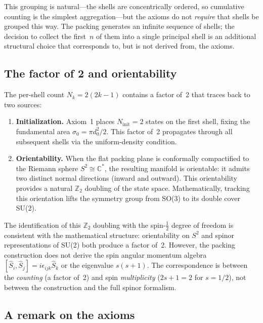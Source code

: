 \documentclass[aps,prl,reprint,amsmath,amssymb]{revtex4-2}
\begin{document}
This grouping is natural---the shells are concentrically ordered, so
cumulative counting is the simplest aggregation---but the axioms do
not \emph{require} that shells be grouped this way.  The packing
generates an infinite sequence of shells; the decision to collect the
first~$n$ of them into a single principal shell is an additional
structural choice that corresponds to, but is not derived from, the
axioms.

\subsection{The factor of 2 and orientability}

The per-shell count $N_k = 2(2k-1)$ contains a factor of~2 that
traces back to two sources:

\begin{enumerate}
\item \textbf{Initialization.}  Axiom~1 places
  $N_{\mathrm{init}} = 2$ states on the first shell, fixing the
  fundamental area $\sigma_0 = \pi d_0^2 / 2$.  This factor of~2
  propagates through all subsequent shells via the uniform-density
  condition.

\item \textbf{Orientability.}  When the flat packing plane is
  conformally compactified to the Riemann sphere
  $S^2 \cong \mathbb{C}^*$, the resulting manifold is orientable: it
  admits two distinct normal directions (inward and outward).  This
  orientability provides a natural $\mathbb{Z}_2$ doubling of the
  state space.  Mathematically, tracking this orientation lifts the
  symmetry group from SO(3) to its double cover SU(2).
\end{enumerate}

The identification of this $\mathbb{Z}_2$ doubling with the
spin-$\tfrac{1}{2}$ degree of freedom is consistent with the
mathematical structure: orientability on $S^2$ and spinor
representations of SU(2) both produce a factor of~2.  However, the
packing construction does not derive the spin angular momentum algebra
$[\hat{S}_i, \hat{S}_j] = i\epsilon_{ijk}\hat{S}_k$ or the
eigenvalue $s(s+1)$.  The correspondence is between the \emph{counting}
(a factor of~2) and spin \emph{multiplicity} ($2s+1 = 2$ for
$s = 1/2$), not between the construction and the full spinor
formalism.

\subsection{A remark on the axioms}
\end{document}
